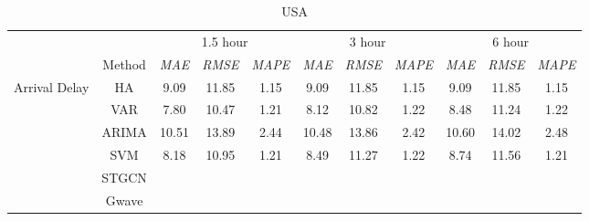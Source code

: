 \documentclass[12pt,a4paper]{report}
\begin{document}
\renewcommand{\arraystretch}{0.85}
\begin{table}[h]
    \caption{USA}

    \centering
    \footnotesize
    \begin{tabular}{ccccccccccc}
        \toprule
                                          &                 & \multicolumn{3}{c}{1.5 hour} & \multicolumn{3}{c}{3 hour} & \multicolumn{3}{c}{6 hour}                                                                                                                                      \\
                                          & Method          & \textit{MAE}                 & \textit{RMSE}              & \multicolumn{1}{c|}{\textit{MAPE} } & \textit{MAE}   & \textit{RMSE}  & \multicolumn{1}{c|}{\textit{MAPE}}  & \textit{MAE}   & \textit{RMSE}   & \textit{MAPE}  \\ \midrule
        \multirow{11}{*}{Arrival Delay}   & HA              & 9.09                         & 11.85                      & \multicolumn{1}{c|}{1.15}           & 9.09           & 11.85          & \multicolumn{1}{c|}{1.15}           & 9.09           & 11.85           & 1.15           \\
                                          & VAR             & 7.80                         & 10.47                      & \multicolumn{1}{c|}{1.21}           & 8.12           & 10.82          & \multicolumn{1}{c|}{1.22}           & 8.48           & 11.24           & 1.22           \\
                                          & ARIMA           & 10.51                        & 13.89                      & \multicolumn{1}{c|}{2.44}           & 10.48          & 13.86          & \multicolumn{1}{c|}{2.42}           & 10.60          & 14.02           & 2.48           \\
                                          & SVM             & 8.18                         & 10.95                      & \multicolumn{1}{c|}{1.21}           & 8.49           & 11.27          & \multicolumn{1}{c|}{1.22}           & 8.74           & 11.56           & 1.21           \\
                                          & STGCN           &                              &                            & \multicolumn{1}{c|}{}               &                &                & \multicolumn{1}{c|}{}               &                &                 &                \\
                                          & Gwave           &                              &                            & \multicolumn{1}{c|}{}               &                &                & \multicolumn{1}{c|}{}               &                &                 &                \\

\end{tabular}
\end{table}
\end{document}
